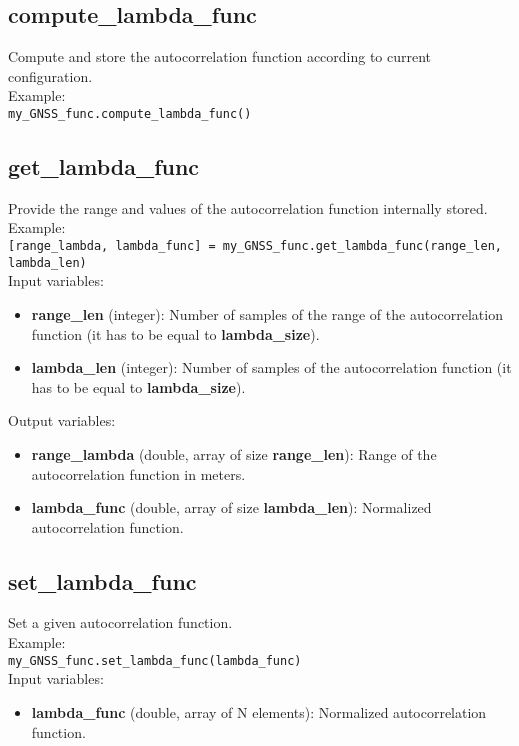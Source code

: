 \subsection{compute\_lambda\_func}

Compute and store the autocorrelation function according to current configuration.\\

Example:\\

\texttt{my\_GNSS\_func.compute\_lambda\_func()}\\


\subsection{get\_lambda\_func}

Provide the range and values of the autocorrelation function internally stored.\\

Example:\\

\texttt{[range\_lambda, lambda\_func] = my\_GNSS\_func.get\_lambda\_func(range\_len, lambda\_len)}\\

Input variables:
\begin{itemize}
\item {\bf range\_len} (integer): Number of samples of the range of the autocorrelation function (it has to be equal to {\bf lambda\_size}).
\item {\bf lambda\_len} (integer): Number of samples of the autocorrelation function (it has to be equal to {\bf lambda\_size}). 
\end{itemize}

Output variables:
\begin{itemize}
\item {\bf range\_lambda} (double, array of size {\bf range\_len}): Range of the autocorrelation function in meters.
\item {\bf lambda\_func} (double, array of size {\bf lambda\_len}): Normalized autocorrelation function.
\end{itemize}


\subsection{set\_lambda\_func}

Set a given autocorrelation function.\\

Example:\\

\texttt{my\_GNSS\_func.set\_lambda\_func(lambda\_func)}\\

Input variables:
\begin{itemize}
\item {\bf lambda\_func} (double, array of N elements): Normalized autocorrelation function.
\end{itemize}

